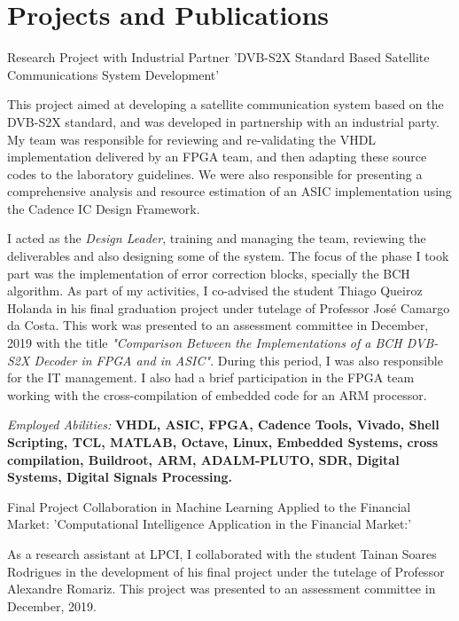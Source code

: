 \documentclass[a4paper]{twentysecondcv} %
\begin{document}
\section{Projects and Publications}
\begin{twenty}
\twentyitem
{Research Project with Industrial Partner}
{'DVB-S2X Standard Based Satellite Communications System Development'}
{}
{\hspace{8pt} This project aimed at developing a satellite communication system based on the DVB-S2X standard, and was developed in partnership with an industrial party. My team was responsible for reviewing and re-validating the VHDL implementation delivered by an FPGA team, and then adapting these source codes to the laboratory guidelines. We were also responsible for presenting a comprehensive analysis and resource estimation of an ASIC implementation using the Cadence IC Design Framework. 

\hspace{8pt}I acted as the \textit{Design Leader}, training and managing the team, reviewing the deliverables and also designing some of the system. The focus of the phase I took part was the implementation of error correction blocks, specially the BCH algorithm. As part of my activities, I co-advised the student Thiago Queiroz Holanda in his final graduation project under tutelage of Professor José Camargo da Costa. This work was presented to an assessment committee in December, 2019 with the title \textit{"Comparison Between the Implementations of a BCH DVB-S2X Decoder in FPGA and in ASIC"}. During this period, I was also responsible for the IT management. I also had a brief participation in the FPGA team working with the cross-compilation of embedded code for an ARM processor.

\hspace{8pt}\textit{Employed Abilities: } \textbf{VHDL, ASIC, FPGA, Cadence Tools, Vivado, Shell Scripting, TCL, MATLAB, Octave, Linux, Embedded Systems, cross compilation, Buildroot, ARM, ADALM-PLUTO, SDR, Digital Systems, Digital Signals Processing.\\}}


\twentyitem
{Final Project Collaboration in Machine Learning Applied to the Financial Market:}
{'Computational Intelligence Application in the Financial Market:'}
{}
{\hspace{8pt} As a research assistant at LPCI, I collaborated with the student Tainan Soares Rodrigues in the development of his final project under the tutelage of Professor Alexandre Romariz. This project was presented to an assessment committee in December, 2019.

}
\end{twenty}
\end{document}
